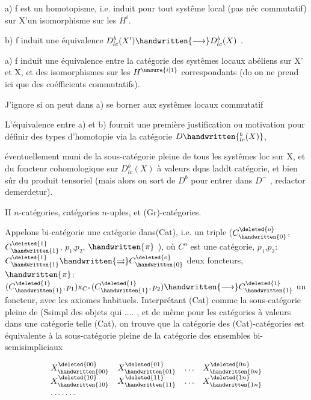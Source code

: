 a) f est un homotopisme, i.e. induit pour tout systême local (pas
néc commutatif) sur X'un isomorphisme sur les $H^{i}$.

b)  f induit une équivalence $D^{b}_{lc}(X')\handwritten{\longrightarrow} D^{b}_{lc}(X)$ .

a) f induit une équivalence entre la catégorie des systêmes locaux
abéliens sur X' et X, et des isomorphismes sur les $H^{\unsure{i|1}}$ correspondants (do
on ne prend ici que des coéfficients commutatifs).

 J'ignore si on peut dans a) se borner aux systêmes locaux commutatif

L'équivalence entre a) et b) fournit une première justification ou
motivation pour définir des types d'homotopie via la catégorie $D\handwritten{^{b}_{lc}(X)}$,



éventuellement muni de la sous-catégorie pleine de tous les systêmes loc
sur X, et du foncteur cohomologique sur $D^{b}_{lc}(X)$ à valeurs dqns laddt
catégorie, et bien sûr du produit tensoriel (mais alors on sort de $D^{b}$
pour entrer dans $D^{-}$ , redactor demerdetur).

II \quad $n$-catégories, catégories $n$-uples, et (Gr)-catégories.

Appelons bi-catégorie une catégorie dans(Cat), i.e. un triple
($C^{\deleted{o}}_{\handwritten{0}}$,$C^{\deleted{1}}_{\handwritten{1}}$, $p_{1}$,$p_{2}$, $\handwritten{\pi}$ ), où $C^{o}$ est une catégorie, $p_{1}$,$p_{2}$: $C^{\deleted{1}}_{\handwritten{1}} \handwritten{\rightrightarrows} C^{\deleted{o}}_{\handwritten{0}}$ deux
foncteurs, $\handwritten{\pi}$:$(C^{\deleted{1}}_{\handwritten{1}},p_{1})\mathrm{x}_{C^{o}}(C^{\deleted{1}}_{\handwritten{1}},p_{2}) \handwritten{\longrightarrow} C^{\deleted{1}}_{\handwritten{1}}$ un foncteur, avec les axiomes
habituels. Interprétant (Cat) comme la sous-catégorie pleine de (Ssimpl
des objets qui .... , et de même pour les catégories à valeurs dans une
catégorie telle (Cat), on trouve que la catégorie  des (Cat)-catégories
est équivalente à la sous-catégorie pleine de la catégorie des ensembles
bi-semisimpliciaux

\[
\begin{array}{cccc}
X^{\deleted{00}}_{\handwritten{00}} & X^{\deleted{01}}_{\handwritten{01}} & \ldots & X^{\deleted{0n}}_{\handwritten{0n}}\\
X^{\deleted{10}}_{\handwritten{10}} & X^{\deleted{11}}_{\handwritten{11}} & \ldots & X^{\deleted{1n}}_{\handwritten{1n}}\\
\multicolumn{2}{l}{.\,.\,.\,.\,.\,.\,.} & &
\end{array}
\]

